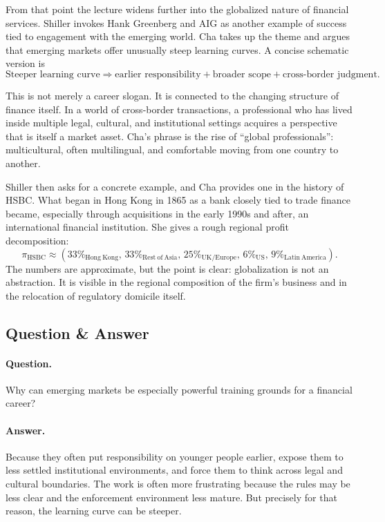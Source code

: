 From that point the lecture widens further into the globalized nature of financial services. Shiller invokes Hank Greenberg and AIG as another example of success tied to engagement with the emerging world. Cha takes up the theme and argues that emerging markets offer unusually steep learning curves. A concise schematic version is
\begin{equation}
\text{Steeper learning curve}
\Rightarrow
\text{earlier responsibility} + \text{broader scope} + \text{cross-border judgment}.
\end{equation}

This is not merely a career slogan. It is connected to the changing structure of finance itself. In a world of cross-border transactions, a professional who has lived inside multiple legal, cultural, and institutional settings acquires a perspective that is itself a market asset. Cha's phrase is the rise of ``global professionals'': multicultural, often multilingual, and comfortable moving from one country to another.

Shiller then asks for a concrete example, and Cha provides one in the history of HSBC. What began in Hong Kong in 1865 as a bank closely tied to trade finance became, especially through acquisitions in the early 1990s and after, an international financial institution. She gives a rough regional profit decomposition:
\begin{equation}
\pi_{\mathrm{HSBC}} \approx
(33\%_{\mathrm{Hong\ Kong}},\,
33\%_{\mathrm{Rest\ of\ Asia}},\,
25\%_{\mathrm{UK/Europe}},\,
6\%_{\mathrm{US}},\,
9\%_{\mathrm{Latin\ America}}).
\end{equation}
The numbers are approximate, but the point is clear: globalization is not an abstraction. It is visible in the regional composition of the firm's business and in the relocation of regulatory domicile itself.

\subsection{Question \& Answer}

\paragraph{Question.} Why can emerging markets be especially powerful training grounds for a financial career?

\paragraph{Answer.} Because they often put responsibility on younger people earlier, expose them to less settled institutional environments, and force them to think across legal and cultural boundaries. The work is often more frustrating because the rules may be less clear and the enforcement environment less mature. But precisely for that reason, the learning curve can be steeper.

